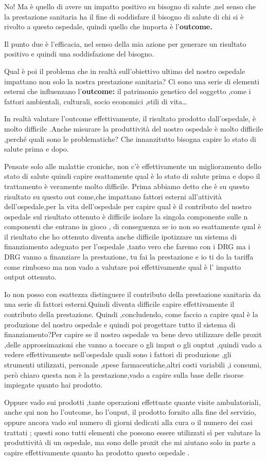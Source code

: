\documentclass[]{article}
\begin{document}
No! Ma è quello di avere un impatto positivo su bisogno di salute ,nel
senso che la prestazione sanitaria ha il fine di soddisfare il bisogno
di salute di chi si è rivolto a questo ospedale, quindi quello che
importa è l'\textbf{outcome.}

Il punto due è l'efficacia, nel senso della mia azione per generare un
risultato positivo e quindi una soddisfazione del bisogno.

Qual è poi il problema che in realtà sull'obiettivo ultimo del nostro
ospedale impattano non solo la nostra prestazione sanitaria? Ci sono una
serie di elementi esterni che influenzano l'\textbf{outcome:} il
patrimonio genetico del soggetto ,come i fattori ambientali, culturali,
socio economici ,stili di vita\ldots{}

In realtà valutare l'outcome effettivamente, il risultato prodotto
dall'ospedale, è molto difficile .Anche misurare la produttività del
nostro ospedale è molto difficile ,perché quali sono le problematiche?
Che innanzitutto bisogna capire lo stato di salute prima e dopo.

Pensate solo alle malattie croniche, non c'è effettivamente un
miglioramento dello stato di salute quindi capire esattamente qual è lo
stato di salute prima e dopo il trattamento è veramente molto difficile.
Prima abbiamo detto che è su questo risultato su questo out come,che
impattano fattori esterni all'attività dell'ospedale,per la vita
dell'ospedale per capire qual è il contributo del nostro ospedale sul
risultato ottenuto è difficile isolare la singola componente sulle n
componenti che entrano in gioco , di conseguenza se io non so
esattamente qual è il risultato che ho ottenuto diventa anche difficile
ipotizzare un sistema di finanziamento adeguato per l'ospedale ,tanto
vero che faremo con i DRG ma i DRG vanno a finanziare la prestazione, tu
fai la prestazione e io ti do la tariffa come rimborso ma non vado a
valutare poi effettivamente qual è l' impatto output ottenuto.

Io non posso con esattezza distinguere il contributo della prestazione
sanitaria da una serie di fattori esterni.Quindi diventa difficile
capire effettivamente il contributo della prestazione. Quindi
,concludendo, come faccio a capire qual è la produzione del nostro
ospedale e quindi poi progettare tutto il sistema di finanziamento?Per
capire se il nostro ospedale va bene devo utilizzare delle proxit ,delle
approssimazioni che vanno a toccare o gli imput o gli ouptut ,quindi
vado a vedere effettivamente nell'ospedale quali sono i fattori di
produzione ,gli strumenti utilizzati, personale ,spese
farmaceutiche,altri costi variabili ,i consumi, però chiaro questa non è
la prestazione,vado a capire sulla base delle risorse impiegate quanto
hai prodotto.

Oppure vado sui prodotti ,tante operazioni effettuate quante visite
ambulatoriali, anche qui non ho l'outcome, ho l'ouput, il prodotto
fornito alla fine del servizio, oppure ancora vado sul numero di giorni
dedicati alla cura o il numero dei casi trattati ; questi sono tutti
elementi che possono essere utilizzati sì per valutare la produttività
di un ospedale, ma sono delle proxit che mi aiutano solo in parte a
capire effettivamente quanto ha prodotto questo ospedale .
\end{document}
